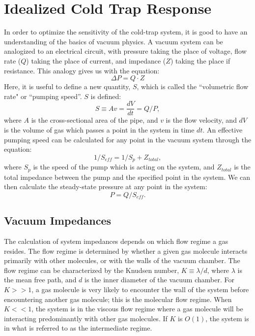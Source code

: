 \documentclass[12pt]{article}
\begin{document}
\section{Idealized Cold Trap Response}
\label{sec:vaceq}
In order to optimize the sensitivity of the cold-trap system, it is good to have an understanding of the basics of vacuum physics. A vacuum system can be analogized to an electrical circuit, with pressure taking the place of voltage, flow rate ($Q$) taking the place of current, and impedance ($Z$) taking the place if resistance.  This analogy gives us with the equation:
\begin{equation}
\label{eq:vaclaw1}
\Delta P = Q\cdot Z
\end{equation} 
Here, it is useful to define a new quantity, $S$, which is called the ``volumetric flow rate" or ``pumping speed''. $S$ is defined: 
\begin{equation}
\label{eq:volflow}
S \equiv Av = \frac{dV}{dt}=Q/P, 
\end{equation}
where $A$ is the cross-sectional area of the pipe, and $v$ is the flow velocity, and $dV$ is the volume of gas which passes a point in the system in time $dt$. An effective pumping speed can be calculated for any point in the vacuum system through the equation:
\begin{equation}
\label{ep:vacimp}
1/S_{eff} = 1/S_{p}+Z_{total}, 
\end{equation}
where $S_{p}$ is the speed of the pump which is acting on the system, and $Z_{total}$ is the total impedance between the pump and the specified point in the system. We can then calculate the steady-state pressure at any point in the system\cite{vac_eq}:
\begin{equation}
\label{eq:vaclaw2}
P=Q/S_{eff}.
\end{equation}

\subsection{Vacuum Impedances}
The calculation of system impedances depends on which flow regime a gas resides. The flow regime is determined by whether a given gas molecule interacts primarily with other molecules, or with the walls of the vacuum chamber. The flow regime can be characterized by the Knudsen number, $K \equiv \lambda/d$, where $\lambda$ is the mean free path, and $d$ is the inner diameter of the vacuum chamber. For $K>>1$, a gas molecule is very likely to encounter the wall of the system before encountering another gas molecule; this is the molecular flow regime. When $K<<1$, the system is in the viscous flow regime where a gas molecule will be interacting predominantly with other gas molecules. If $K$ is $O(1)$, the system is in what is referred to as the intermediate regime.\cite{vac_eq}
\end{document}
